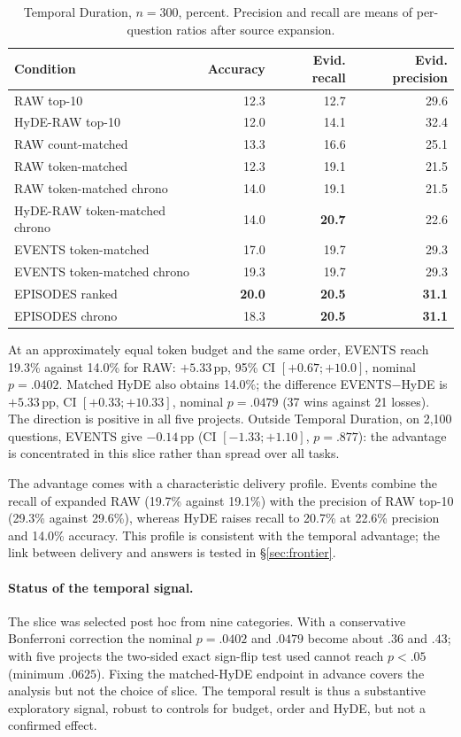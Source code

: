 \documentclass[11pt,a4paper]{article}
\newcommand{\raw}{RAW}
\newcommand{\events}{EVENTS}
\newcommand{\pp}{\,\text{pp}}
\begin{document}
\begin{table}[ht]
\centering\small
\begin{tabular}{lrrr}
\toprule
Condition & Accuracy & Evid. recall & Evid. precision\\
\midrule
RAW top-10 & 12.3 & 12.7 & 29.6\\
HyDE-RAW top-10 & 12.0 & 14.1 & 32.4\\
RAW count-matched & 13.3 & 16.6 & 25.1\\
RAW token-matched & 12.3 & 19.1 & 21.5\\
RAW token-matched chrono & 14.0 & 19.1 & 21.5\\
HyDE-RAW token-matched chrono & 14.0 & \textbf{20.7} & 22.6\\
EVENTS token-matched & 17.0 & 19.7 & 29.3\\
EVENTS token-matched chrono & 19.3 & 19.7 & 29.3\\
EPISODES ranked & \textbf{20.0} & \textbf{20.5} & \textbf{31.1}\\
EPISODES chrono & 18.3 & \textbf{20.5} & \textbf{31.1}\\
\bottomrule
\end{tabular}
\caption{Temporal Duration, $n=300$, percent. Precision and recall are means of
per-question ratios after source expansion.}
\label{tab:controls}
\end{table}

At an approximately equal token budget and the same order, \events{} reach 19.3\%
against 14.0\% for \raw{}: $+5.33\pp$, 95\% CI $[+0.67;+10.0]$, nominal $p=.0402$.
Matched HyDE also obtains 14.0\%; the difference \events{}$-$HyDE is $+5.33\pp$, CI
$[+0.33;+10.33]$, nominal $p=.0479$ (37 wins against 21 losses). The direction is
positive in all five projects. Outside Temporal Duration, on 2,100 questions,
\events{} give $-0.14\pp$ (CI $[-1.33;+1.10]$, $p=.877$): the advantage is concentrated
in this slice rather than spread over all tasks.

The advantage comes with a characteristic delivery profile. Events combine the
recall of expanded RAW (19.7\% against 19.1\%) with the precision of RAW top-10
(29.3\% against 29.6\%), whereas HyDE raises recall to 20.7\% at 22.6\% precision and
14.0\% accuracy. This profile is consistent with the temporal advantage; the link
between delivery and answers is tested in §\ref{sec:frontier}.

\paragraph{Status of the temporal signal.}
The slice was selected post hoc from nine categories. With a conservative Bonferroni
correction the nominal $p=.0402$ and $.0479$ become about $.36$ and $.43$; with five
projects the two-sided exact sign-flip test used cannot reach $p<.05$ (minimum
$.0625$). Fixing the matched-HyDE endpoint in advance covers the analysis but not the
choice of slice. The temporal result is thus a substantive exploratory signal,
robust to controls for budget, order and HyDE, but not a confirmed effect.
\end{document}
